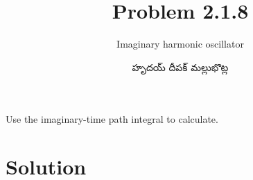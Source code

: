 \documentclass{article}
\title{Problem 2.1.8}
\subtitle{Imaginary harmonic oscillator}
\author{\begin{telugu}హృదయ్ దీపక్ మల్లుభొట్ల\end{telugu}}
\date{}
\begin{document}
	\maketitle
	Use the imaginary-time path integral to calculate.
	\section{Solution} \label{sec:solution}
\end{document}
